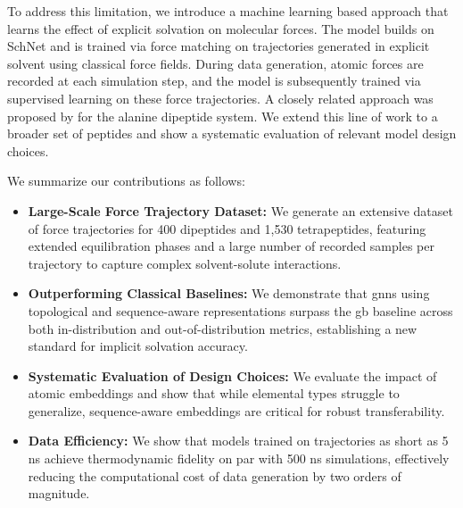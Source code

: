 
To address this limitation, we introduce a machine learning based approach that learns the effect of explicit solvation on molecular forces. The model builds on SchNet \citep{schutt2018schnet} and is trained via force matching on trajectories generated in explicit solvent using classical force fields. During data generation, atomic forces are recorded at each simulation step, and the model is subsequently trained via supervised learning on these force trajectories. A closely related approach was proposed by \citet{machine_learning_implicit_solvation} for the alanine dipeptide system. We extend this line of work to a broader set of peptides and show a systematic evaluation of relevant model design choices.

We summarize our contributions as follows:
\begin{itemize}
    \item \textbf{Large-Scale Force Trajectory Dataset:} We generate an extensive dataset of force trajectories for 400 dipeptides and 1,530 tetrapeptides, featuring extended equilibration phases and a large number of recorded samples per trajectory to capture complex solvent-solute interactions.
    \item \textbf{Outperforming Classical Baselines:} We demonstrate that \glspl{gnn} using topological and sequence-aware representations surpass the \gls{gb} baseline across both in-distribution and out-of-distribution metrics, establishing a new standard for implicit solvation accuracy.
    \item \textbf{Systematic Evaluation of Design Choices:} We evaluate the impact of atomic embeddings and show that while elemental types struggle to generalize, sequence-aware embeddings are critical for robust transferability. 
    \item \textbf{Data Efficiency:} We show that models trained on trajectories as short as 5 ns achieve thermodynamic fidelity on par with 500 ns simulations, effectively reducing the computational cost of data generation by two orders of magnitude.
\end{itemize}